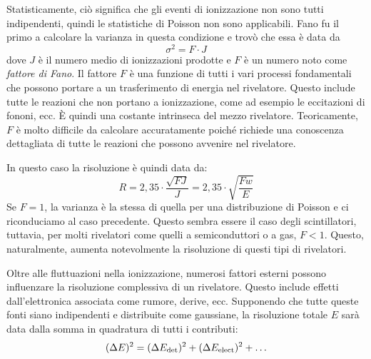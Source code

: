 Statisticamente, ciò significa che gli eventi di ionizzazione non sono tutti indipendenti, quindi le statistiche di Poisson non sono applicabili. Fano fu il primo a calcolare la varianza in questa condizione e trovò che essa è data da
\begin{equation*}
   \sigma^2 = F \cdot J
\end{equation*}
dove $J$ è il numero medio di ionizzazioni prodotte e $F$ è un numero noto come \textit{fattore di Fano}. Il fattore $F$ è una funzione di tutti i vari processi fondamentali che possono portare a un trasferimento di energia nel rivelatore. Questo include tutte le reazioni che non portano a ionizzazione, come ad esempio le eccitazioni di fononi, ecc. È quindi una costante intrinseca del mezzo rivelatore. Teoricamente, $F$ è molto difficile da calcolare accuratamente poiché richiede una conoscenza dettagliata di tutte le reazioni che possono avvenire nel rivelatore.

In questo caso la risoluzione è quindi data da:
\begin{equation*}
   R
   =2,35 \cdot \frac{\sqrt{FJ}}{J}
   =2,35 \cdot \sqrt{\frac{Fw}{E}}
\end{equation*}
Se $F=1$, la varianza è la stessa di quella per una distribuzione di Poisson e ci riconduciamo al caso precedente. Questo sembra essere il caso degli scintillatori, tuttavia, per molti rivelatori come quelli a semiconduttori o a gas, $F<1$. Questo, naturalmente, aumenta notevolmente la risoluzione di questi tipi di rivelatori.

\vspace{0.2cm}Oltre alle fluttuazioni nella ionizzazione, numerosi fattori esterni possono influenzare la risoluzione complessiva di un rivelatore. Questo include effetti dall'elettronica associata come rumore, derive, ecc. Supponendo che tutte queste fonti siano indipendenti e distribuite come gaussiane, la risoluzione totale $E$ sarà data dalla somma in quadratura di tutti i contributi:
\begin{equation*}
   (\Delta E)^2
   =(\Delta E_{\rm det})^2 + (\Delta E_{\rm elect})^2 + \ldots
\end{equation*}


